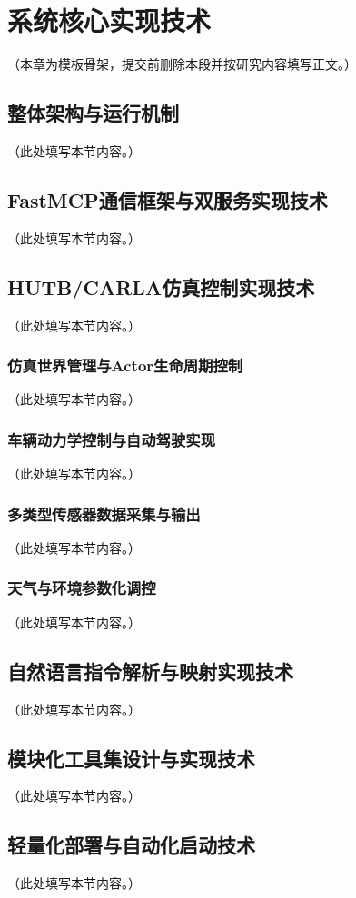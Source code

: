 
\chapter{系统核心实现技术}

（本章为模板骨架，提交前删除本段并按研究内容填写正文。）

\section{整体架构与运行机制}

（此处填写本节内容。）

\section{FastMCP通信框架与双服务实现技术}

（此处填写本节内容。）

\section{HUTB/CARLA仿真控制实现技术}

（此处填写本节内容。）

\subsection{仿真世界管理与Actor生命周期控制}

（此处填写本节内容。）

\subsection{车辆动力学控制与自动驾驶实现}

（此处填写本节内容。）

\subsection{多类型传感器数据采集与输出}

（此处填写本节内容。）

\subsection{天气与环境参数化调控}

（此处填写本节内容。）

\section{自然语言指令解析与映射实现技术}

（此处填写本节内容。）

\section{模块化工具集设计与实现技术}

（此处填写本节内容。）

\section{轻量化部署与自动化启动技术}

（此处填写本节内容。）
